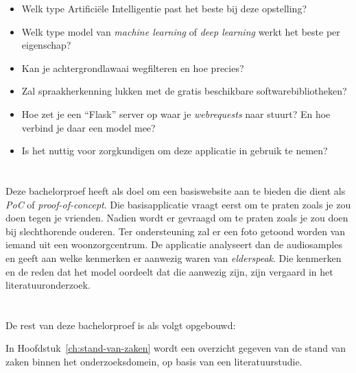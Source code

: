 \begin{itemize}
    \item Welk type Artificiële Intelligentie past het beste bij deze opstelling?
    \item Welk type model van \textit{machine learning} of \textit{deep learning} werkt het beste per eigenschap?
    \item Kan je achtergrondlawaai wegfilteren en hoe precies?
    \item Zal spraakherkenning lukken met de gratis beschikbare softwarebibliotheken?
    \item Hoe zet je een ``Flask'' server op waar je \textit{webrequests} naar stuurt? En hoe verbind je daar een model mee?
    \item Is het nuttig voor zorgkundigen om deze applicatie in gebruik te nemen?
\end{itemize}

\section{}
\label{sec:onderzoeksdoelstelling}

Deze bachelorproef heeft als doel om een basiswebsite aan te bieden die dient als \textit{PoC} of \textit{proof-of-concept}. Die basisapplicatie vraagt eerst om te praten zoals je zou doen tegen je vrienden. Nadien wordt er gevraagd om te praten zoals je zou doen bij slechthorende ouderen. Ter ondersteuning zal er een foto getoond worden van iemand uit een woonzorgcentrum. De applicatie analyseert dan de audiosamples en geeft aan welke kenmerken er aanwezig waren van \textit{elderspeak}.
Die kenmerken en de reden dat het model oordeelt dat die aanwezig zijn, zijn vergaard in het literatuuronderzoek.

\section{}
\label{sec:opzet-bachelorproef}


De rest van deze bachelorproef is als volgt opgebouwd:

In Hoofdstuk~\ref{ch:stand-van-zaken} wordt een overzicht gegeven van de stand van zaken binnen het onderzoeksdomein, op basis van een literatuurstudie.

